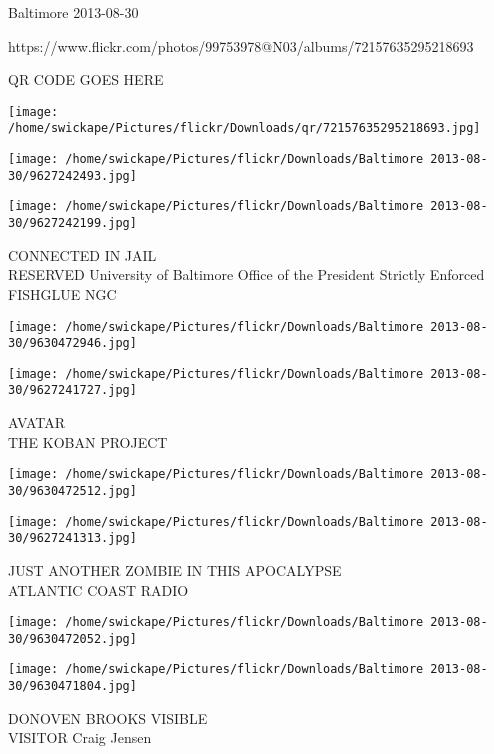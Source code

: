 \documentclass[10pt,letterpaper]{article}
\begin{document}
Baltimore 2013-08-30

https://www.flickr.com/photos/99753978@N03/albums/72157635295218693

QR CODE GOES HERE

\texttt{[image: /home/swickape/Pictures/flickr/Downloads/qr/72157635295218693.jpg]}
\pagebreak

\texttt{[image: /home/swickape/Pictures/flickr/Downloads/Baltimore 2013-08-30/9627242493.jpg]}

\vspace{0.25in}
\texttt{[image: /home/swickape/Pictures/flickr/Downloads/Baltimore 2013-08-30/9627242199.jpg]}

CONNECTED IN JAIL\\
RESERVED University of Baltimore Office of the President Strictly Enforced FISHGLUE NGC\\
\pagebreak

\texttt{[image: /home/swickape/Pictures/flickr/Downloads/Baltimore 2013-08-30/9630472946.jpg]}

\vspace{0.25in}
\texttt{[image: /home/swickape/Pictures/flickr/Downloads/Baltimore 2013-08-30/9627241727.jpg]}

AVATAR\\
THE KOBAN PROJECT\\
\pagebreak

\texttt{[image: /home/swickape/Pictures/flickr/Downloads/Baltimore 2013-08-30/9630472512.jpg]}

\vspace{0.25in}
\texttt{[image: /home/swickape/Pictures/flickr/Downloads/Baltimore 2013-08-30/9627241313.jpg]}

JUST ANOTHER ZOMBIE IN THIS APOCALYPSE\\
ATLANTIC COAST RADIO\\
\pagebreak

\texttt{[image: /home/swickape/Pictures/flickr/Downloads/Baltimore 2013-08-30/9630472052.jpg]}

\vspace{0.25in}
\texttt{[image: /home/swickape/Pictures/flickr/Downloads/Baltimore 2013-08-30/9630471804.jpg]}

DONOVEN BROOKS VISIBLE\\
VISITOR Craig Jensen\\
\pagebreak
\end{document}
